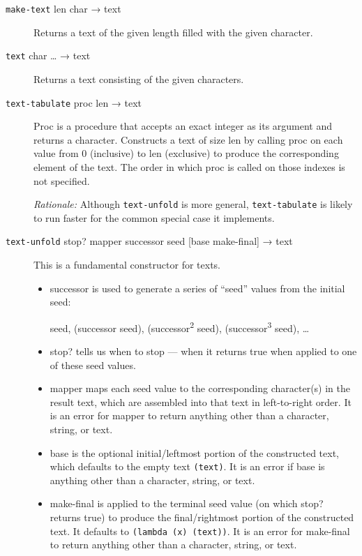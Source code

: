 \begin{description}
\item[ \href{}{} \texttt{make-text} len char → text ]
Returns a text of the given length filled with the given character.
\item[ \href{}{} \texttt{text} char \ldots{} → text ]
Returns a text consisting of the given characters.
\item[ \href{}{} \texttt{text-tabulate} proc len → text ]
Proc is a procedure that accepts an exact integer as its argument and
returns a character. Constructs a text of size len by calling proc on
each value from 0 (inclusive) to len (exclusive) to produce the
corresponding element of the text. The order in which proc is called on
those indexes is not specified.

\emph{Rationale:} Although \texttt{text-unfold} is more general,
\texttt{text-tabulate} is likely to run faster for the common special
case it implements.
\item[ \href{}{} \texttt{text-unfold} stop? mapper successor seed
{[}base make-final{]} → text ]
This is a fundamental constructor for texts.

\begin{itemize}
\tightlist
\item
  successor is used to generate a series of ``seed'' values from the
  initial seed:

  seed, (successor seed), (successor\textsuperscript{2} seed),
  (successor\textsuperscript{3} seed), \ldots{}
\item
  stop? tells us when to stop --- when it returns true when applied to
  one of these seed values.
\item
  mapper maps each seed value to the corresponding character(s) in the
  result text, which are assembled into that text in left-to-right
  order. It is an error for mapper to return anything other than a
  character, string, or text.
\item
  base is the optional initial/leftmost portion of the constructed text,
  which defaults to the empty text \texttt{(text)}. It is an error if
  base is anything other than a character, string, or text.
\item
  make-final is applied to the terminal seed value (on which stop?
  returns true) to produce the final/rightmost portion of the
  constructed text. It defaults to \texttt{(lambda\ (x)\ (text))}. It is
  an error for make-final to return anything other than a character,
  string, or text.
\end{itemize}


\end{description}
